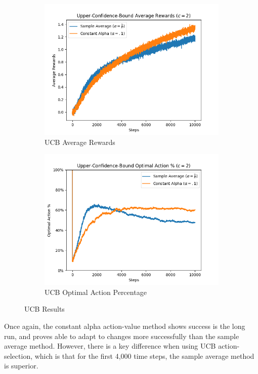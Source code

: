 \documentclass{article}
\begin{document}
\begin{figure}[ht]

\begin{subfigure}{0.5\textwidth}
\includegraphics[scale=0.4]{ucb_average_rewards.png} 
\caption{UCB Average Rewards}
\label{fig:ucb average rewards}
\end{subfigure}
\begin{subfigure}{0.5\textwidth}
\includegraphics[scale=0.4]{ucb_optimal_action_pct.png}
\caption{UCB Optimal Action Percentage}
\label{fig:ucb optimal action pct}
\end{subfigure}
\caption{UCB Results}
\end{figure}

Once again, the constant alpha action-value method shows success is the long run, and proves able to adapt to changes more successfully than the sample average method. However, there is a key difference when using UCB action-selection, which is that for the first 4,000 time steps, the sample average method is superior.
\end{document}
